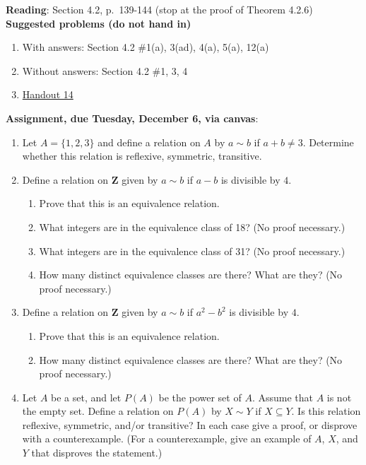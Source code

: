 \documentclass[12pt]{article}
\begin{document}
\noindent \textbf{Reading}: Section 4.2, p.~139-144 (stop at the proof of Theorem 4.2.6)
\\



\noindent \textbf{Suggested problems (do not hand in)}

\begin{enumerate}
\item With answers: Section 4.2 \#1(a), 3(ad), 4(a), 5(a), 12(a)
\item Without answers: Section 4.2 \#1, 3, 4
\item \href{https://www.math.emory.edu/~dzb/teaching/250Fall2021/handouts/250-H14-equivalence-relations.pdf}{Handout 14}
\end{enumerate}


\noindent \textbf{Assignment, due Tuesday, December 6, via canvas}:
\begin{enumerate}
\item Let $A = \{1,2,3\}$ and define a relation on $A$ by $a \sim b$ if $a + b \neq 3$. Determine whether this relation is reflexive, symmetric, transitive.
\item Define a relation on $\mathbf{Z}$ given by $a \sim b$ if $a-b$ is divisible by $4$.
 \begin{enumerate}
 \item Prove that this is an equivalence relation.
 \item What integers are in the equivalence class of 18? (No proof necessary.)
 \item What integers are in the equivalence class of 31? (No proof necessary.) 
 \item How many distinct equivalence classes are there? What are they? (No proof necessary.)
 \end{enumerate}
\item Define a relation on $\mathbf{Z}$ given by $a \sim b$ if $a^2-b^2$ is divisible by $4$.
 \begin{enumerate}
 \item Prove that this is an equivalence relation.
 \item How many distinct equivalence classes are there? What are they? (No proof necessary.)
 \end{enumerate} 
\item Let $A$ be a set, and let $P(A)$ be the power set of $A$. Assume that $A$ is not the empty set. Define a relation on $P(A)$ by $X \sim Y$ if $X \subseteq Y$. Is this relation reflexive, symmetric, and/or transitive? In each case give a proof, or disprove with a counterexample. (For a counterexample, give an example of $A$, $X$, and $Y$ that disproves the statement.)
\end{enumerate}
\end{document}
